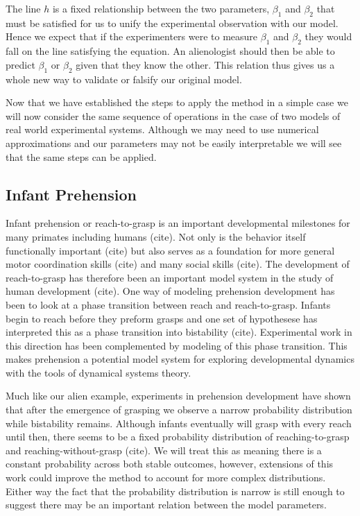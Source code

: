 \documentclass[letterpaper]{article}
\begin{document}
The line $h$ is a fixed relationship between
the two parameters, $\beta_1$ and $\beta_2$ that must be satisfied for us to 
unify the experimental observation with
our model. Hence we expect that if the experimenters were to measure $\beta_1$ and 
$\beta_2$ they would fall on the line satisfying the equation. An alienologist 
should then be able to predict $\beta_1$ or $\beta_2$ given that they
know the other. This relation thus gives us a whole new way to validate or
falsify our original model. 

Now that we have established the steps to apply the method in a simple case we will now 
consider the same sequence of operations in the case of two models of real world experimental
systems. Although we may need to use numerical approximations and our parameters may not
be easily interpretable we will see that the same steps can be applied.

\subsection{Infant Prehension}

Infant prehension or reach-to-grasp is an important developmental milestones 
for many primates including humans (cite). Not only is the behavior itself
functionally important (cite) but also serves as a foundation for more general motor
coordination skills (cite) and many social skills (cite). The development of 
reach-to-grasp
has therefore been an important model system in the study of human development (cite). 
One way of modeling prehension development has been to look at a phase transition
between reach and reach-to-grasp. Infants begin to reach before they preform grasps and
one set of hypothesese has interpreted this as a phase transition into bistability (cite). 
Experimental work in this direction has been complemented by modeling of this phase
transition. This makes prehension a potential model system for exploring developmental
dynamics with the tools of dynamical systems theory.

Much like our alien example, experiments in prehension development 
have shown that after
the emergence of grasping we observe a narrow probability distribution 
while bistability
remains. Although infants eventually will grasp with every reach until 
then, there seems to
be a fixed probability distribution of reaching-to-grasp and 
reaching-without-grasp (cite).
We will treat this as meaning there is a constant probability across 
both stable outcomes,
however, extensions of this work could improve the method to account for
more complex distributions.
Either way the fact that the probability distribution is narrow is still 
enough to suggest
there may be an important relation between the model parameters.
\end{document}
